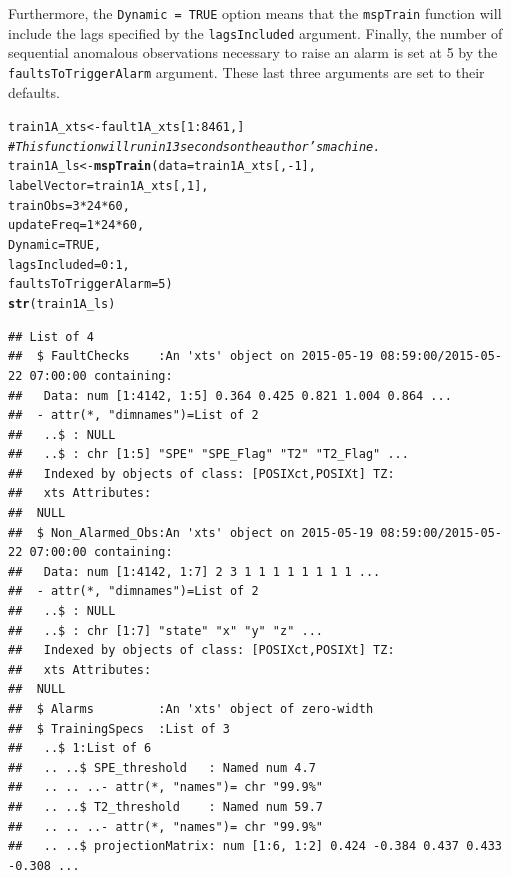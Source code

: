 \documentclass{report}\usepackage[]{graphicx}\usepackage[]{color}
\makeatletter
\newcommand{\hlnum}[1]{\textcolor[rgb]{0.686,0.059,0.569}{#1}}%
\newcommand{\hlcom}[1]{\textcolor[rgb]{0.678,0.584,0.686}{\textit{#1}}}%
\newcommand{\hlopt}[1]{\textcolor[rgb]{0,0,0}{#1}}%
\newcommand{\hlstd}[1]{\textcolor[rgb]{0.345,0.345,0.345}{#1}}%
\newcommand{\hlkwb}[1]{\textcolor[rgb]{0.69,0.353,0.396}{#1}}%
\newcommand{\hlkwc}[1]{\textcolor[rgb]{0.333,0.667,0.333}{#1}}%
\newcommand{\hlkwd}[1]{\textcolor[rgb]{0.737,0.353,0.396}{\textbf{#1}}}%
\newenvironment{kframe}{%
 \def\at@end@of@kframe{}%
 \ifinner\ifhmode%
  \def\at@end@of@kframe{\end{minipage}}%
  \begin{minipage}{\columnwidth}%
 \fi\fi%
 \def\FrameCommand##1{\hskip\@totalleftmargin \hskip-\fboxsep
 \colorbox{shadecolor}{##1}\hskip-\fboxsep
     \hskip-\linewidth \hskip-\@totalleftmargin \hskip\columnwidth}%
 \MakeFramed {\advance\hsize-\width
   \@totalleftmargin\z@ \linewidth\hsize
   \@setminipage}}%
 {\par\unskip\endMakeFramed%
 \at@end@of@kframe}
\newenvironment{knitrout}{}{} %
\makeatother
\begin{document}
Furthermore, the \texttt{Dynamic = TRUE} option means that the \texttt{mspTrain} function will include the lags specified by the \texttt{lagsIncluded} argument. Finally, the number of sequential anomalous observations necessary to raise an alarm is set at 5 by the \texttt{faultsToTriggerAlarm} argument. These last three arguments are set to their defaults.
\begin{knitrout}
\color{fgcolor}\begin{kframe}
\begin{alltt}
\hlstd{train1A_xts} \hlkwb{<-} \hlstd{fault1A_xts[}\hlnum{1}\hlopt{:}\hlnum{8461}\hlstd{,]}
\hlcom{# This function will run in 13 seconds on the author's machine.}
\hlstd{train1A_ls} \hlkwb{<-} \hlkwd{mspTrain}\hlstd{(}\hlkwc{data} \hlstd{= train1A_xts[,}\hlopt{-}\hlnum{1}\hlstd{],}
                       \hlkwc{labelVector} \hlstd{= train1A_xts[,}\hlnum{1}\hlstd{],}
                       \hlkwc{trainObs} \hlstd{=} \hlnum{3} \hlopt{*} \hlnum{24} \hlopt{*} \hlnum{60}\hlstd{,}
                       \hlkwc{updateFreq} \hlstd{=} \hlnum{1} \hlopt{*} \hlnum{24} \hlopt{*} \hlnum{60}\hlstd{,}
                       \hlkwc{Dynamic} \hlstd{=} \hlnum{TRUE}\hlstd{,}
                       \hlkwc{lagsIncluded} \hlstd{=} \hlnum{0}\hlopt{:}\hlnum{1}\hlstd{,}
                       \hlkwc{faultsToTriggerAlarm} \hlstd{=} \hlnum{5}\hlstd{)}
\hlkwd{str}\hlstd{(train1A_ls)}
\end{alltt}
\begin{verbatim}
## List of 4
##  $ FaultChecks    :An 'xts' object on 2015-05-19 08:59:00/2015-05-22 07:00:00 containing:
##   Data: num [1:4142, 1:5] 0.364 0.425 0.821 1.004 0.864 ...
##  - attr(*, "dimnames")=List of 2
##   ..$ : NULL
##   ..$ : chr [1:5] "SPE" "SPE_Flag" "T2" "T2_Flag" ...
##   Indexed by objects of class: [POSIXct,POSIXt] TZ: 
##   xts Attributes:  
##  NULL
##  $ Non_Alarmed_Obs:An 'xts' object on 2015-05-19 08:59:00/2015-05-22 07:00:00 containing:
##   Data: num [1:4142, 1:7] 2 3 1 1 1 1 1 1 1 1 ...
##  - attr(*, "dimnames")=List of 2
##   ..$ : NULL
##   ..$ : chr [1:7] "state" "x" "y" "z" ...
##   Indexed by objects of class: [POSIXct,POSIXt] TZ: 
##   xts Attributes:  
##  NULL
##  $ Alarms         :An 'xts' object of zero-width
##  $ TrainingSpecs  :List of 3
##   ..$ 1:List of 6
##   .. ..$ SPE_threshold   : Named num 4.7
##   .. .. ..- attr(*, "names")= chr "99.9%"
##   .. ..$ T2_threshold    : Named num 59.7
##   .. .. ..- attr(*, "names")= chr "99.9%"
##   .. ..$ projectionMatrix: num [1:6, 1:2] 0.424 -0.384 0.437 0.433 -0.308 ...

\end{verbatim}
\end{kframe}
\end{knitrout}
\end{document}
